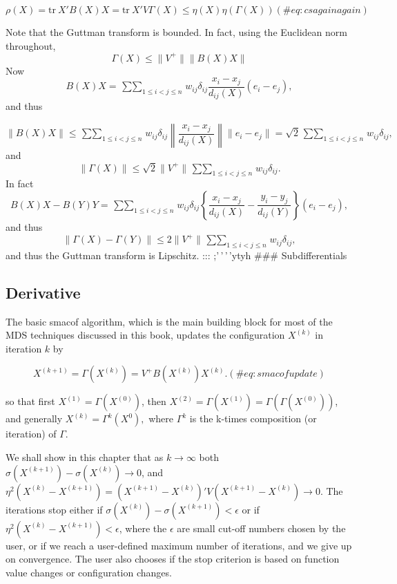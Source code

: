 \documentclass[
  12pt,
  letterpaper,
  DIV=11,
  numbers=noendperiod]{scrreprt}
\theoremstyle{remark}
\begin{document}
\begin{equation}
\rho(X)=\text{tr}\ X'B(X)X=\text{tr}\ X'V\Gamma(X)\leq\eta(X)\eta(\Gamma(X))
(\#eq:csagainagain)
\end{equation}

Note that the Guttman transform is bounded. In fact, using the Euclidean
norm throughout, \[
\Gamma(X)\leq\|V^+\|\|B(X)X\|
\] Now \[
B(X)X=\mathop{\sum\sum}_{1\leq i<j\leq n}w_{ij}\delta_{ij}\frac{x_i-x_j}{d_{ij}(X)}(e_i-e_j),
\] and thus

\[
\|B(X)X\|\leq\mathop{\sum\sum}_{1\leq i<j\leq n}w_{ij}\delta_{ij}\left\|\frac{x_i-x_j}{d_{ij}(X)}\right\|\|e_i-e_j\|=\sqrt{2}\mathop{\sum\sum}_{1\leq i<j\leq n}w_{ij}\delta_{ij},
\] and \[
\|\Gamma(X)\|\leq\sqrt{2}\|V^+\|\mathop{\sum\sum}_{1\leq i<j\leq n}w_{ij}\delta_{ij}.
\] In fact \[
B(X)X-B(Y)Y=\mathop{\sum\sum}_{1\leq i<j\leq n}w_{ij}\delta_{ij}\left\{\frac{x_i-x_j}{d_{ij}(X)}-\frac{y_i-y_j}{d_{ij}(Y)}\right\}(e_i-e_j),
\] and thus \[
\|\Gamma(X)-\Gamma(Y)\|\leq 2\|V^+\|
\mathop{\sum\sum}_{1\leq i<j\leq n}w_{ij}\delta_{ij},
\] and thus the Guttman transform is Lipschitz. ::: ;'\,'\,'\,'ytyh
\#\#\# Subdifferentials

\subsection{Derivative}\label{derivative}

The basic smacof algorithm, which is the main building block for most of
the MDS techniques discussed in this book, updates the configuration
\(X^{(k)}\) in iteration \(k\) by

\begin{equation}
X^{(k+1)}=\Gamma(X^{(k)})=V^+B(X^{(k)})X^{(k)}.
(\#eq:smacofupdate)
\end{equation}

so that first \(X^{(1)}=\Gamma(X^{(0)})\), then
\(X^{(2)}=\Gamma(X^{(1)})=\Gamma(\Gamma(X^{(0)}))\), and generally
\(X^{(k)}=\Gamma^k(X^{0}),\) where \(\Gamma^k\) is the k-times
composition (or iteration) of \(\Gamma.\)

We shall show in this chapter that as \(k\rightarrow\infty\) both\\
\(\sigma(X^{(k+1)})-\sigma(X^{(k)})\rightarrow 0\), and
\(\eta^2(X^{(k)}-X^{(k+1)})=(X^{(k+1)}-X^{(k)})'V(X^{(k+1)}-X^{(k)})\rightarrow 0\).
The iterations stop either if
\(\sigma(X^{(k)})-\sigma(X^{(k+1)})<\epsilon\) or if
\(\eta^2(X^{(k)}-X^{(k+1)})<\epsilon\), where the \(\epsilon\) are small
cut-off numbers chosen by the user, or if we reach a user-defined
maximum number of iterations, and we give up on convergence. The user
also chooses if the stop criterion is based on function value changes or
configuration changes.
\end{document}
